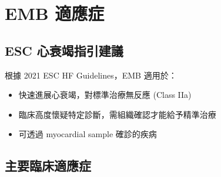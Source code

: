 \documentclass[12pt,a4paper]{article}
\begin{document}
\section{EMB 適應症}

\subsection{ESC 心衰竭指引建議}

根據 2021 ESC HF Guidelines，EMB 適用於：
\begin{itemize}
    \item 快速進展心衰竭，對標準治療無反應 (Class IIa)
    \item 臨床高度懷疑特定診斷，需組織確認才能給予精準治療
    \item 可透過 myocardial sample 確診的疾病
\end{itemize}

\subsection{主要臨床適應症}
\end{document}
